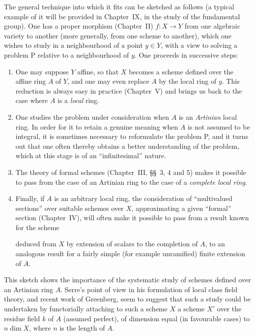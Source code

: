 The general technique into which it fits can be sketched as follows (a typical example of it will be provided in Chapter~IX, in the study of the fundamental group).
One has a proper morphism (Chapter~II) $f:X\to Y$ from one algebraic variety to another (more generally, from one scheme to another), which one wishes to study in a neighbourhood of a point $y\in Y$, with a view to solving a problem P relative to a neighbourhood of $y$.
One proceeds in successive steps:
\begin{enumerate}
  \item[1\textsuperscript{o}] One may suppose $Y$ affine, so that $X$ becomes a scheme defined over the affine ring $A$ of $Y$, and one may even replace $A$ by the local ring of $y$.
  This reduction is always easy in practice (Chapter~V) and brings us back to the case where $A$ is a \emph{local} ring.
  \item[2\textsuperscript{o}] One studies the problem under consideration when $A$ is an \emph{Artinian} local ring.
  In order for it to retain a genuine meaning when $A$ is not assumed to be integral, it is sometimes necessary to reformulate the problem P, and it turns out that one often thereby obtains a better understanding of the problem, which at this stage is of an ``infinitesimal'' nature.
  \item[3\textsuperscript{o}] The theory of formal schemes (Chapter~III, \S\S~3, 4 and 5) makes it possible to pass from the case of an Artinian ring to the case of a \emph{complete local ring}.
  \item[4\textsuperscript{o}] Finally, if $A$ is an arbitrary local ring, the consideration of ``multivalued sections'' over suitable schemes over $X$, approximating a given ``formal'' section (Chapter~IV), will often make it possible to pass from a result known for the scheme

  deduced from $X$ by extension of scalars to the completion of $A$, to an analogous result for a fairly simple (for example unramified) finite extension of $A$.
\end{enumerate}

This sketch shows the importance of the systematic study of schemes defined over an Artinian ring $A$.
Serre's point of view in his formulation of local class field theory, and recent work of Greenberg, seem to suggest that such a study could be undertaken by functorially attaching to such a scheme $X$ a scheme $X'$ over the residue field $k$ of $A$ (assumed perfect), of dimension equal (in favourable cases) to $n\dim X$, where $n$ is the length of $A$.

